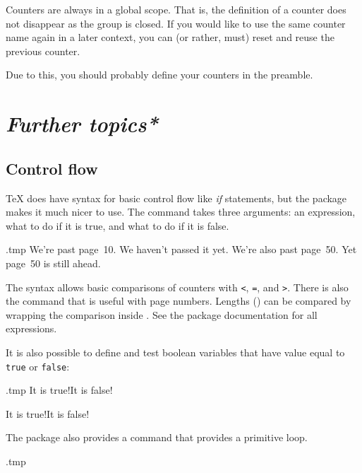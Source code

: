 \begin{technote}
Counters are always in a global scope.
That is, the definition of a counter does not disappear as the group is closed.
If you would like to use the same counter name again in a later context,
you can (or rather, must) reset and reuse the previous counter.

Due to this, you should probably define your counters in the preamble.
\end{technote}


%
%
%
\section{\emph{Further topics*}}

%
%
\subsection{Control flow}\label{sec:if}

\TeX{} does have syntax for basic control flow like \emph{if} statements,
but the  package makes it much nicer to use.
The  command takes three arguments:
an expression, what to do if it is true, and what to do if it is false.
%
\begin{VerbatimOut}{\jobname.tmp}
    {We're past page~10.}
    {We haven't passed it yet.}
    {We're also past page~50.}
    {Yet page~50 is still ahead.}
\end{VerbatimOut}
\ShowExample
%
The syntax allows basic comparisons of counters with
\verb|<|, \verb|=|, and \verb|>|.
There is also the  command that is useful with page numbers.
Lengths () can be compared by wrapping the comparison inside .
See the package documentation for all expressions.

It is also possible to define and test boolean variables
that have value equal to \verb|true| or \verb|false|:\label{ex:booleans}
%
\begin{VerbatimOut}{\jobname.tmp}
    {It is true!}{It is false!}

    {It is true!}{It is false!}
\end{VerbatimOut}
\ShowExample

The package also provides a  command that provides a primitive loop.
%
\begin{VerbatimOut}{\jobname.tmp}

\end{VerbatimOut}
\ShowExample

